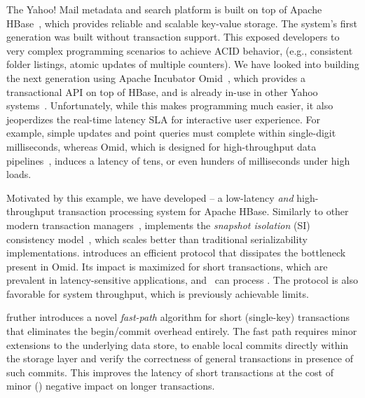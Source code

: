 The Yahoo! Mail metadata and search platform is built on top of Apache HBase~\cite{hbase}, 
which provides reliable and scalable key-value storage. The system's first generation
was built without transaction support. This exposed  developers to very complex programming scenarios 
to achieve ACID behavior, (e.g., consistent folder listings, atomic updates of multiple counters). 
We have looked into building the next generation using 
 Apache Incubator Omid~\cite{omid}, which provides a transactional API on top of HBase, and 
 is already in-use in other Yahoo systems~\cite{omid-blog}.
Unfortunately, while this makes programming much easier, it also jeoperdizes 
the real-time latency SLA for interactive user experience. For example,  
simple updates and point queries must complete within single-digit milliseconds, 
whereas Omid, which is designed for high-throughput data pipelines~\cite{Omid2017}, 
induces a latency of tens, or even hunders of milliseconds under high loads. 

Motivated by this example, we have developed {\sys\/} -- a low-latency {\em and\/} high-throughput 
transaction processing system for Apache HBase. Similarly to other modern transaction managers~\cite{cockroach,Spanner2012,Percolator2010,Omid2017},
{\sys\/} implements the {\em snapshot isolation} (SI) consistency model~\cite{DBLP:conf/sigmod/BerensonBGMOO95},
which scales better than traditional serializability implementations. {\sys\/} introduces an efficient protocol 
that dissipates the bottleneck present in Omid.
Its impact is maximized for short  transactions, which are prevalent in latency-sensitive applications,
and \sys\ can process . The protocol is also favorable for system throughput, 
which is  
previously achievable limits. 

{\sys\/} fruther introduces a novel {\em fast-path\/} algorithm for short (single-key) transactions 
that eliminates the begin/commit overhead entirely. The fast path requires minor extensions to the underlying 
data store, to enable local commits directly within the storage layer and verify the correctness of general 
transactions in presence of such commits. This improves the latency of short transactions 
 at the cost of minor () negative impact on longer transactions. 

